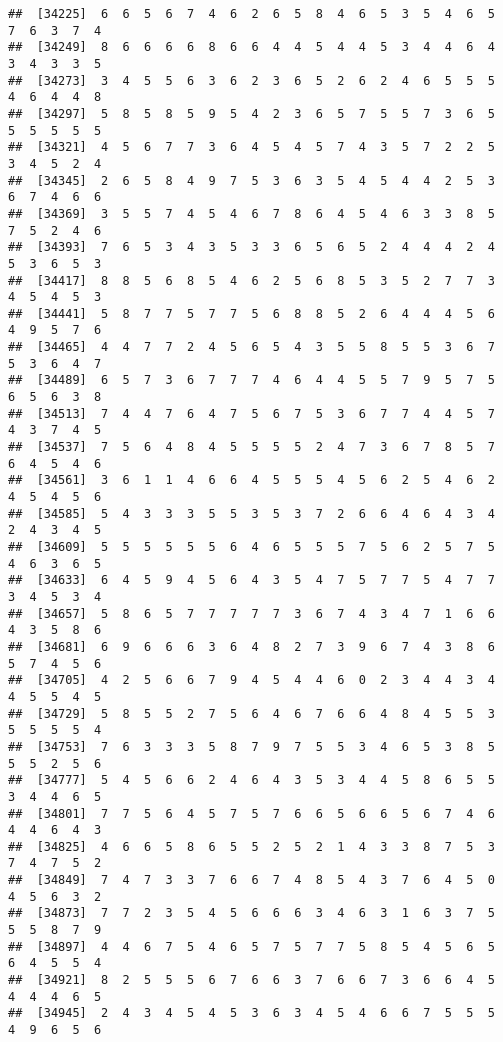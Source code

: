 \documentclass[
]{book}
\begin{document}
\begin{verbatim}
##  [34225]  6  6  5  6  7  4  6  2  6  5  8  4  6  5  3  5  4  6  5  7  6  3  7  4
##  [34249]  8  6  6  6  6  8  6  6  4  4  5  4  4  5  3  4  4  6  4  3  4  3  3  5
##  [34273]  3  4  5  5  6  3  6  2  3  6  5  2  6  2  4  6  5  5  5  4  6  4  4  8
##  [34297]  5  8  5  8  5  9  5  4  2  3  6  5  7  5  5  7  3  6  5  5  5  5  5  5
##  [34321]  4  5  6  7  7  3  6  4  5  4  5  7  4  3  5  7  2  2  5  3  4  5  2  4
##  [34345]  2  6  5  8  4  9  7  5  3  6  3  5  4  5  4  4  2  5  3  6  7  4  6  6
##  [34369]  3  5  5  7  4  5  4  6  7  8  6  4  5  4  6  3  3  8  5  7  5  2  4  6
##  [34393]  7  6  5  3  4  3  5  3  3  6  5  6  5  2  4  4  4  2  4  5  3  6  5  3
##  [34417]  8  8  5  6  8  5  4  6  2  5  6  8  5  3  5  2  7  7  3  4  5  4  5  3
##  [34441]  5  8  7  7  5  7  7  5  6  8  8  5  2  6  4  4  4  5  6  4  9  5  7  6
##  [34465]  4  4  7  7  2  4  5  6  5  4  3  5  5  8  5  5  3  6  7  5  3  6  4  7
##  [34489]  6  5  7  3  6  7  7  7  4  6  4  4  5  5  7  9  5  7  5  6  5  6  3  8
##  [34513]  7  4  4  7  6  4  7  5  6  7  5  3  6  7  7  4  4  5  7  4  3  7  4  5
##  [34537]  7  5  6  4  8  4  5  5  5  5  2  4  7  3  6  7  8  5  7  6  4  5  4  6
##  [34561]  3  6  1  1  4  6  6  4  5  5  5  4  5  6  2  5  4  6  2  4  5  4  5  6
##  [34585]  5  4  3  3  3  5  5  3  5  3  7  2  6  6  4  6  4  3  4  2  4  3  4  5
##  [34609]  5  5  5  5  5  5  6  4  6  5  5  5  7  5  6  2  5  7  5  4  6  3  6  5
##  [34633]  6  4  5  9  4  5  6  4  3  5  4  7  5  7  7  5  4  7  7  3  4  5  3  4
##  [34657]  5  8  6  5  7  7  7  7  7  3  6  7  4  3  4  7  1  6  6  4  3  5  8  6
##  [34681]  6  9  6  6  6  3  6  4  8  2  7  3  9  6  7  4  3  8  6  5  7  4  5  6
##  [34705]  4  2  5  6  6  7  9  4  5  4  4  6  0  2  3  4  4  3  4  4  5  5  4  5
##  [34729]  5  8  5  5  2  7  5  6  4  6  7  6  6  4  8  4  5  5  3  5  5  5  5  4
##  [34753]  7  6  3  3  3  5  8  7  9  7  5  5  3  4  6  5  3  8  5  5  5  2  5  6
##  [34777]  5  4  5  6  6  2  4  6  4  3  5  3  4  4  5  8  6  5  5  3  4  4  6  5
##  [34801]  7  7  5  6  4  5  7  5  7  6  6  5  6  6  5  6  7  4  6  4  4  6  4  3
##  [34825]  4  6  6  5  8  6  5  5  2  5  2  1  4  3  3  8  7  5  3  7  4  7  5  2
##  [34849]  7  4  7  3  3  7  6  6  7  4  8  5  4  3  7  6  4  5  0  4  5  6  3  2
##  [34873]  7  7  2  3  5  4  5  6  6  6  3  4  6  3  1  6  3  7  5  5  5  8  7  9
##  [34897]  4  4  6  7  5  4  6  5  7  5  7  7  5  8  5  4  5  6  5  6  4  5  5  4
##  [34921]  8  2  5  5  5  6  7  6  6  3  7  6  6  7  3  6  6  4  5  4  4  4  6  5
##  [34945]  2  4  3  4  5  4  5  3  6  3  4  5  4  6  6  7  5  5  5  4  9  6  5  6

\end{verbatim}
\end{document}
